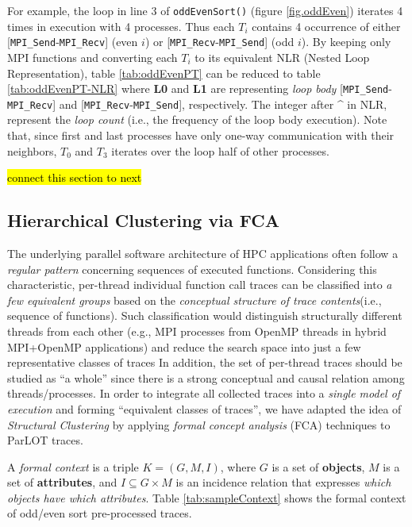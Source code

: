 For example, the loop in line 3 of \texttt{oddEvenSort()} (figure \ref{fig.oddEven}) iterates 4 times in execution with 4 processes. Thus each $T_i$ contains 4 occurrence of either [\texttt{MPI\_Send}-\texttt{MPI\_Recv}] (even $i$) or [\texttt{MPI\_Recv}-\texttt{MPI\_Send}] (odd $i$). By keeping only MPI functions and converting each $T_i$ to its equivalent NLR (Nested Loop Representation), table \ref{tab:oddEvenPT} can be reduced to table \ref{tab:oddEvenPT-NLR} where \textbf{L0} and \textbf{L1} are representing \textit{loop body} [\texttt{MPI\_Send}-\texttt{MPI\_Recv}] and [\texttt{MPI\_Recv}-\texttt{MPI\_Send}], respectively. The integer after \^{} in NLR, represent the \textit{loop count} (i.e., the frequency of the loop body execution). Note that, since first and last processes have only one-way communication with their neighbors, $T_0$ and $T_3$ iterates over the loop half of other processes.

\hl{connect this section to next}


\subsection{Hierarchical Clustering via FCA}
The underlying parallel software architecture of HPC applications often follow a \textit{regular pattern} concerning sequences of executed functions. 
%
Considering this characteristic, per-thread individual function call traces can be classified into \textit{a few equivalent groups} based on the \textit{conceptual structure of trace contents}(i.e., sequence of functions).
% 
Such classification would distinguish structurally different threads from each other (e.g., MPI processes from OpenMP threads in hybrid MPI+OpenMP applications) and reduce the search space into just a few representative classes of traces
%
In addition, the set of per-thread traces should be studied as ``a whole'' since there is a strong conceptual and causal relation among threads/processes.
%
In order to integrate all collected traces into a \textit{single model of execution} and forming ``equivalent classes of traces'', we have adapted the idea of \textit{Structural Clustering}  \cite{weberStructural} by applying \textit{formal concept analysis} (FCA)\cite{clbook} techniques to ParLOT traces.
%

A \textit{formal context} is a triple $K = (G, M, I)$, where $G$ is a set of \textbf{objects}, $M$ is a set of \textbf{attributes}, and $I \subseteq G \times M$ is an incidence relation that expresses \textit{which objects have which attributes}. Table \ref{tab:sampleContext} shows the formal context of odd/even sort pre-processed traces. 

